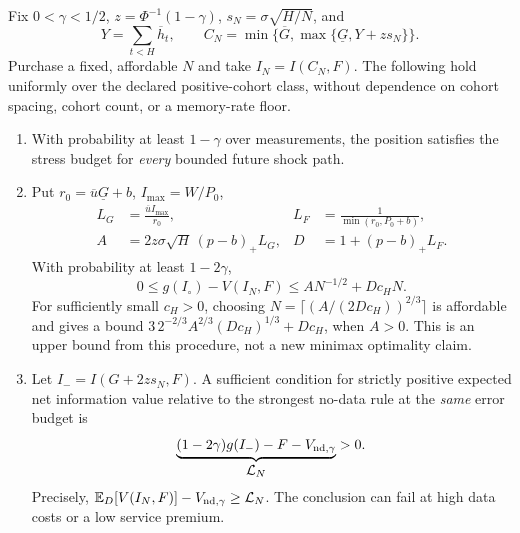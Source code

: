 \begin{theorem}\label{fhc:decision}
Fix $0<\gamma<1/2$, $z=\Phi^{-1}(1-\gamma)$,
$s_N=\sigma\sqrt{H/N}$, and
\[
 Y=\sum_{t<H}\overline h_t,\qquad
 C_N=\min\{\overline G,\max\{\underline G,Y+zs_N\}\}.
\]
Purchase a fixed, affordable $N$ and take $I_N=I(C_N,F)$.
The following hold uniformly over the declared positive-cohort class,
without dependence on cohort spacing, cohort count, or a memory-rate floor.
\begin{enumerate}
\item With probability at least $1-\gamma$ over measurements, the position
      satisfies the stress budget for \emph{every} bounded future shock path.
\item Put $r_0=\overline u\underline G+b$, $I_{\max}=W/P_0$,
\[
 \begin{aligned}
 L_G&=\frac{\overline u I_{\max}}{r_0}, &
 L_F&=\frac{1}{\min(r_0,P_0+b)},\\
 A&=2z\sigma\sqrt H\,(p-b)_+L_G, & D&=1+(p-b)_+L_F.
 \end{aligned}
\]
With probability at least $1-2\gamma$,
\[
 0\le g(I_\circ)-V(I_N,F)\le A N^{-1/2}+D c_HN.
\]
For sufficiently small $c_H>0$, choosing
$N=\lceil(A/(2Dc_H))^{2/3}\rceil$ is affordable and gives a bound
$3\,2^{-2/3}A^{2/3}(Dc_H)^{1/3}+Dc_H$, when $A>0$.
This is an upper bound from this procedure, not a new minimax optimality claim.
\item Let $I_-=I(G+2zs_N,F)$. A sufficient condition for strictly positive
      expected net information value relative to the strongest no-data rule
      at the \emph{same} error budget is
\[
 \underbrace{(1-2\gamma)g(I_-)-F-V_{{\rm nd},\gamma}}_{\displaystyle\mathcal L_N}>0.
\]
Precisely, $\mathbb E_D[V(I_N,F)]-V_{{\rm nd},\gamma}\ge\mathcal L_N$.
The conclusion can fail at high data costs or a low service premium.
\end{enumerate}
\end{theorem}


